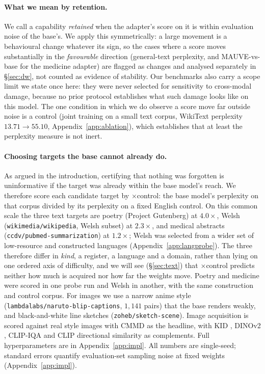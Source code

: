 \documentclass{article}
\begin{document}
\paragraph{What we mean by retention.}
We call a capability \emph{retained} when the adapter's score on it is within
evaluation noise of the base's. We apply this symmetrically: a large movement is
a behavioural change whatever its sign, so the cases where a score moves
substantially in the \emph{favourable} direction (general-text perplexity, and
MAUVE-vs-base for the medicine adapter) are flagged as changes and analysed
separately in \S\ref{sec:dw}, not counted as evidence of stability. Our
benchmarks also carry a scope limit we state once here: they were never selected
for sensitivity to cross-modal damage, because no prior protocol establishes what
such damage looks like on this model. The one condition in which we do observe a
score move far outside noise is a control (joint training on a small text corpus,
WikiText perplexity $13.71\!\to\!55.10$, Appendix~\ref{app:ablation}), which
establishes that at least the perplexity measure is not inert.

\paragraph{Choosing targets the base cannot already do.}
As argued in the introduction, certifying that nothing was forgotten is
uninformative if the target was already within the base model's reach. We
therefore score each candidate target by $\times$control: the base model's
perplexity on that corpus divided by its perplexity on a fixed English control.
On this common scale the three text targets are poetry (Project Gutenberg) at
$4.0\times$, Welsh (\texttt{wikimedia/wikipedia}, Welsh subset) at $2.3\times$,
and medical abstracts (\texttt{ccdv/pubmed-summarization}) at $1.2\times$; Welsh
was selected from a wider set of low-resource and constructed languages
(Appendix~\ref{app:langprobe}). The
three therefore differ in \emph{kind}, a register, a language and a domain,
rather than lying on one ordered axis of difficulty, and we will see
(\S\ref{sec:text}) that $\times$control predicts neither how much is acquired nor
how far the weights move. Poetry and medicine were scored in one probe run and
Welsh in another, with the same construction and control corpus. For images we
use a narrow anime style (\texttt{lambdalabs/naruto-blip-captions}, $1{,}141$
pairs) that the base renders weakly, and black-and-white line sketches
(\texttt{zoheb/sketch-scene}). Image acquisition is scored against real style
images with CMMD \citep{cmmd} as the headline, with KID \citep{kid}, DINOv2
\citep{dinov2}, CLIP-IQA \citep{clipiqa} and CLIP directional similarity
\citep{stylegannada} as complements. Full hyperparameters are in
Appendix~\ref{app:impl}. All numbers are single-seed; standard errors quantify
evaluation-set sampling noise at fixed weights (Appendix~\ref{app:impl}).
\end{document}
